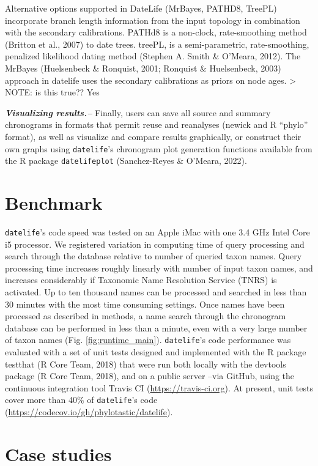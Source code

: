 \documentclass[
  english,
  man]{apa6}
\begin{document}
Alternative options supported in DateLife (MrBayes, PATHD8, TreePL) incorporate branch length information from the input topology in combination with the secondary calibrations.
PATHd8 is a non-clock, rate-smoothing method (Britton et al., 2007) to date trees.
treePL, is a semi-parametric, rate-smoothing, penalized likelihood dating method
(Stephen A. Smith \& O'Meara, 2012).
The MrBayes (Huelsenbeck \& Ronquist, 2001; Ronquist \& Huelsenbeck, 2003) approach in datelife uses the secondary calibrations as priors on node ages.
\textgreater{} NOTE: is this true?? Yes

\emph{\textbf{Visualizing results.--}}
Finally, users can save all source and summary chronograms in formats that permit reuse and reanalyses (newick and R ``phylo'' format), as well as visualize and compare results graphically, or construct their own graphs using \texttt{datelife}'s chronogram plot generation functions available from the R package \texttt{datelifeplot} (Sanchez-Reyes \& O'Meara, 2022).

\hypertarget{benchmark}{%
\section{Benchmark}\label{benchmark}}

\texttt{datelife}'s code speed was tested on an Apple iMac
with one 3.4 GHz Intel Core i5 processor.
We registered variation in computing time of query processing and search through the database relative to number of queried taxon names.
Query processing time increases roughly linearly with number of input taxon names, and
increases considerably if Taxonomic Name Resolution Service (TNRS) is activated.
Up to ten thousand names can be processed and searched in less than 30 minutes with the most time consuming settings.
Once names have been processed as described in methods, a name search through the chronogram database can be performed in less than a minute, even with a very large number of taxon names (Fig. \ref{fig:runtime_main}).
\texttt{datelife}'s code performance was evaluated with a set of unit tests designed and
implemented with the R package testthat (R Core Team, 2018) that were run both locally
with the devtools package (R Core Team, 2018), and on a public server --via
GitHub, using the continuous integration tool Travis CI (\url{https://travis-ci.org}). At
present, unit tests cover more than 40\% of \texttt{datelife}'s code (\url{https://codecov.io/gh/phylotastic/datelife}).

\hypertarget{case-studies}{%
\section{Case studies}\label{case-studies}}
\end{document}
